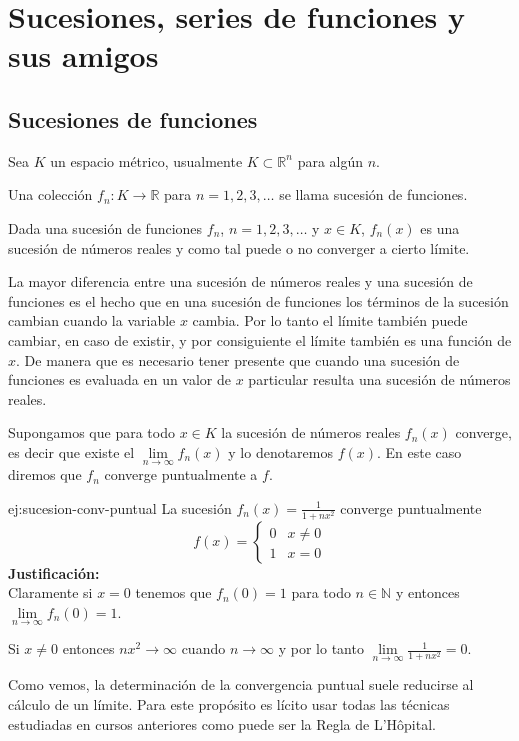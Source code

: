 \chapter{Sucesiones, series de funciones y sus amigos}


\section{Sucesiones de funciones}
Sea $K$ un espacio métrico, usualmente $K\subset \mathbb{R}^n$ para algún $n$. 

Una colección $f_n:K\to \mathbb{R}$ para $n=1,2,3,\ldots$ se llama sucesión de funciones.

Dada una sucesión de funciones $f_n$, $n=1,2,3,\ldots$  y $x\in K$, $f_n(x)$
es una sucesión de números reales y como tal puede o no converger a cierto límite.

La mayor diferencia entre una sucesión de números reales y una sucesión de funciones es
el hecho que en una sucesión de funciones los términos de la sucesión cambian cuando la variable
$x$ cambia. 
Por lo tanto el límite también puede cambiar, en caso de existir, y por consiguiente el límite
también es una función de $x$.
De manera que es necesario tener presente que cuando una sucesión de funciones es evaluada en
un valor de  $x$ particular resulta una sucesión de números reales.

Supongamos que para todo $x \in K$ la sucesión de números reales $f_n(x)$ converge,  
es decir que existe el $\lim\limits_{n \to \infty} f_n(x)$ y lo denotaremos $f(x)$. 
En este caso diremos que $f_n$ converge puntualmente a $f$.
 
\begin{ejemplo}{ej:sucesion-conv-puntual}
La sucesión $f_n(x)=\frac{1}{1+nx^2}$ converge puntualmente 
\[f(x)=\left\{\begin{array}{ll}
0&x\neq 0
\\
1&x=0
\end{array}
\right.\]
\textbf{Justificación:}
\\
Claramente si $x=0$ tenemos que $f_n(0)=1$ para todo $n \in \mathbb{N}$ y entonces $\lim\limits_{n \to \infty}f_n(0)=1$.

Si $x\neq 0$ entonces $nx^2\to \infty$ cuando $n\to \infty$  y por lo tanto $\lim\limits_{n \to \infty} \frac{1}{1+nx^2}=0$.

Como vemos, la determinación de la convergencia puntual suele reducirse al cálculo de un límite. 
Para este propósito es lícito usar todas las técnicas estudiadas en cursos anteriores como puede ser la Regla de L'H\^opital.
\end{ejemplo}

